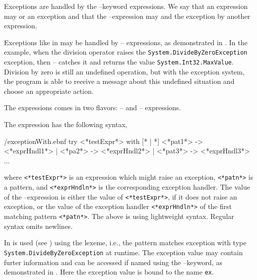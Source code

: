 \documentclass[fsharpNotes.tex]{subfiles}
\begin{document}
Exceptions are handled by the --keyword expressions. We say that an expression may  or  an exception and that the --expression may  and  the exception by another expression.

Exceptions like in  may be handled by -- expressions, as demonstrated in .
%
%
In the example, when the division operator raises the \lstinline{System.DivideByZeroException} exception, then -- catches it and returns the value \lstinline{System.Int32.MaxValue}. Division by zero is still an undefined operation, but with the exception system, the program is able to receive a message about this undefined situation and choose an appropriate action.

The  expressions comes in two flavors: -- and -- expressions.

The  expression has the following syntax,
%
\begin{verbatimwrite}{\ebnf/exceptionWith.ebnf}
try
   <*testExpr*>
with
   [* | *] <*pat1*> -> <*exprHndl1*>
   | <*pa2*> -> <*exprHndl2*>
   | <*pat3*> -> <*exprHndl3*>
   ...
\end{verbatimwrite}
%
where \lstinline[language=syntax]{<*testExpr*>} is an expression which might raise an exception, \lstinline[language=syntax]{<*patn*>} is a pattern, and \lstinline[language=syntax]{<*exprHndln*>} is the corresponding exception handler. The value of the --expression is either the value of \lstinline[language=syntax]{<*testExpr*>}, if it does not raise an exception, or the value of the exception handler \lstinline[language=syntax]{<*exprHndln*>} of the first matching pattern \lstinline[language=syntax]{<*patn*>}. The above is using lightweight syntax. Regular syntax omits newlines.

In   is used (see ) using the  lexeme, i.e., the pattern matches exception with type \lstinline{System.DivideByZeroException} at runtime. The exception value may contain furter information and can be accessed if named using the --keyword, as demonstrated in .
%
%
Here the exception value is bound to the name \lstinline{ex}.
\end{document}

